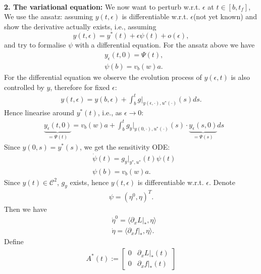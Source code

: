 \quad\\
\textbf{2. The variational equation: } We now want to perturb w.r.t. $\epsilon$ at $t \in [b, t_f]$,  We use the ansatz: assuming $y(t, \epsilon)$ is differentiable w.r.t. $\epsilon$(not yet known) and show the derivative actually exists, i.e., assuming 
\begin{equation}
	y(t, \epsilon) = y^*(t) + \epsilon \psi(t) + o(\epsilon),
\end{equation}
and try to formalise $\psi$ with a differential equation. For the ansatz above we have
\begin{align*}
	&y_\epsilon (t, 0) = \Psi(t), \\
	&\psi(b) = v_b(w)a. 
\end{align*}
For the differential equation we observe the evolution process of $y(\epsilon, t)$ is also controlled by $y$, therefore for fixed $\epsilon$:
\begin{align*}
	y(t, \epsilon) = y(b, \epsilon) + \int_b^t g|_{y(\epsilon, \cdot), u^*(\cdot)}(s) ds.
\end{align*}
Hence linearise around $y^*(t)$, i.e.,  as $\epsilon \rightarrow 0$:
\begin{align*}
	& \underbrace{y_\epsilon(t, 0)}_{= \Psi(t)}  = v_b(w) a  + \int_b^t g_y\bigg|_{y(0, \cdot), u^*(\cdot)}(s) \cdot  \underbrace{y_\epsilon (s, 0)}_{= \Psi(s)} ds
\end{align*}
Since $y(0, s) = y^*(s)$, we get the sensitivity ODE:
\begin{equation}
\begin{aligned}
	& \dot{\psi}(t) =  g_y\bigg|_{y^*, u^*}(t) \psi(t) \\
	& \psi(b) = v_b(w)a. 
\end{aligned}
\end{equation}
Since $y(t) \in \mathcal{C}^2$, $g_y$ exists, hence $y(t, \epsilon)$ is differentiable w.r.t. $\epsilon$. Denote 
\begin{align*}
	\psi = (\eta^0, \eta)^T.
\end{align*}
Then we have
\begin{equation*}
\begin{aligned}
	& \dot{\eta}^0 = \langle \partial_x L|_*, \eta \rangle\\
	& \dot{\eta} = \langle \partial_x f|_*, \eta \rangle. 
\end{aligned}
\end{equation*}
Define
\begin{align*}
A^*(t):= 
\begin{bmatrix}
	0 & \partial_x L|_*(t)\\
	0 & \partial_xf|_*(t)
\end{bmatrix}
\end{align*}


